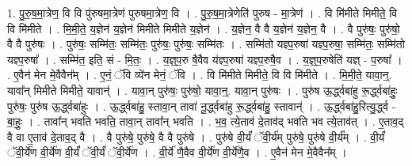 \documentclass[17pt]{extarticle}
\begin{document}
1. पु॒रु॒ष॒मा॒त्रेण॒ वि वि पु॑रुषमा॒त्रेण॑ पुरुषमा॒त्रेण॒ वि । . पु॒रु॒ष॒मा॒त्रेणेति॑ पुरुष - मा॒त्रेण॑ । . वि मि॑मीते मिमीते॒ वि वि मि॑मीते । . मि॒मी॒ते॒ य॒ज्ञेन॑ य॒ज्ञेन॑ मिमीते मिमीते य॒ज्ञेन॑ । . य॒ज्ञेन॒ वै वै य॒ज्ञेन॑ य॒ज्ञेन॒ वै । . वै पुरु॑षः॒ पुरु॑षो॒ वै वै पुरु॑षः । . पुरु॑षः॒ सम्मि॑तः॒ सम्मि॑तः॒ पुरु॑षः॒ पुरु॑षः॒ सम्मि॑तः । . सम्मि॑तो यज्ञ्प॒रुषा॑ यज्ञ्प॒रुषा॒ सम्मि॑तः॒ सम्मि॑तो यज्ञ्प॒रुषा᳚ । . सम्मि॑त॒ इति॒ सं - मि॒तः॒ । . य॒ज्ञ्॒प॒रु षै॒वैव य॑ज्ञ्प॒रुषा॑ यज्ञ्प॒रुषै॒व । . य॒ज्ञ्॒प॒रुषेति॑ यज्ञ् - प॒रुषा᳚ । . ए॒वैन॑ मेन मे॒वैवैन᳚म् । . ए॒नं॒ ॅवि व्ये॑न मेनं॒ ॅवि । . वि मि॑मीते मिमीते॒ वि वि मि॑मीते । . मि॒मी॒ते॒ यावा॒न्॒. यावा᳚न् मिमीते मिमीते॒ यावान्॑ । . यावा॒न् पुरु॑षः॒ पुरु॑षो॒ यावा॒न्॒. यावा॒न् पुरु॑षः । . पुरु॑ष ऊ॒र्द्ध्वबा॑हु रू॒र्द्ध्वबा॑हुः॒ पुरु॑षः॒ पुरु॑ष ऊ॒र्द्ध्वबा॑हुः । . ऊ॒र्द्ध्वबा॑हु॒ स्तावा॒न् तावा॑ नू॒र्द्ध्वबा॑हु रू॒र्द्ध्वबा॑हु॒ स्तावान्॑ । . ऊ॒र्द्ध्वबा॑हु॒रित्यु॒र्द्ध्व - बा॒हुः॒ । . तावा᳚न् भवति भवति॒ तावा॒न् तावा᳚न् भवति । . भ॒व॒ त्ये॒ताव॑ दे॒ताव॑द् भवति भव त्ये॒ताव॑त् । . ए॒ताव॒द् वै वा ए॒ताव॑ दे॒ताव॒द् वै । . वै पुरु॑षे॒ पुरु॑षे॒ वै वै पुरु॑षे । . पुरु॑षे वी॒र्यं॑ ॅवी॒र्य॑म् पुरु॑षे॒ पुरु॑षे वी॒र्य᳚म् । . वी॒र्यं॑ ॅवी॒र्ये॑ण वी॒र्ये॑ण वी॒र्यं॑ ॅवी॒र्यं॑ ॅवी॒र्ये॑ण । . वी॒र्ये॑ णै॒वैव वी॒र्ये॑ण वी॒र्ये॑णै॒व । . ए॒वैन॑ मेन मे॒वैवैन᳚म् । \newline
\end{document}
